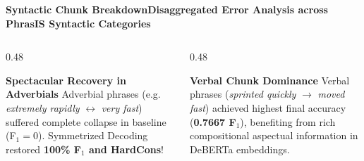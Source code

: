 \documentclass[aspectratio=169,10pt]{beamer}
\begin{document}
\begin{frame}{\textbf{Syntactic Chunk Breakdown}}{\textbf{Disaggregated Error Analysis across PhrasIS Syntactic Categories}}
  \begin{columns}[T]
    \begin{column}{0.48\textwidth}
      \begin{block}{\textbf{Spectacular Recovery in Adverbials}}
        \footnotesize
        Adverbial phrases (e.g. \textit{extremely rapidly} $\leftrightarrow$ \textit{very fast}) suffered complete collapse in baseline (F$_1=0$). Symmetrized Decoding restored \textbf{100\% F$_1$ and HardCons}!
      \end{block}
    \end{column}
    \begin{column}{0.48\textwidth}
      \begin{block}{\textbf{Verbal Chunk Dominance}}
        \footnotesize
        Verbal phrases (\textit{sprinted quickly} $\to$ \textit{moved fast}) achieved highest final accuracy (\textbf{0.7667 F$_1$}), benefiting from rich compositional aspectual information in DeBERTa embeddings.
      \end{block}
    \end{column}
  \end{columns}
\end{frame}
\end{document}
